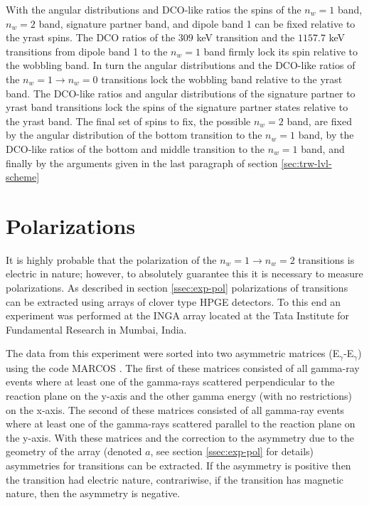With the angular distributions and DCO-like ratios the spins of the $n_w=1$ band, $n_w=2$ band, signature partner band, and dipole band 1 can be fixed relative to the yrast spins. The DCO ratios of the $309$ keV transition and the $1157.7$ keV transitions from dipole band 1 to the $n_w=1$ band firmly lock its spin relative to the wobbling band. In turn the angular distributions and the DCO-like ratios of the $n_w=1\rightarrow{}n_w=0$ transitions lock the wobbling band relative to the yrast band. The DCO-like ratios and angular distributions of the signature partner to yrast band transitions lock the spins of the signature partner states relative to the yrast band. The final set of spins to fix, the possible $n_w=2$ band, are fixed by the angular distribution of the bottom transition to the $n_w=1$ band, by the DCO-like ratios of the bottom and middle transition to the $n_w=1$ band, and finally by the arguments given in the last paragraph of section \ref{sec:trw-lvl-scheme}

\section{Polarizations}
\label{ssec:trw-lvl-pol}

It is highly probable that the polarization of the $n_w=1\rightarrow{}n_w=2$ transitions is electric in nature; however, to absolutely guarantee this it is necessary to measure polarizations. As described in section \ref{ssec:exp-pol} polarizations of transitions can be extracted using arrays of clover type HPGE detectors. To this end an experiment was performed at the INGA array \cite{ingaAtIUAC,ingaAtIuacConf} located at the Tata Institute for Fundamental Research in Mumbai, India.

The data from this experiment were sorted into two asymmetric matrices (E$_{\gamma}$-E$_{\gamma}$) using the code MARCOS \cite{IngaDigitalDAQ}. The first of these matrices consisted of all gamma-ray events where at least one of the gamma-rays scattered perpendicular to the reaction plane on the y-axis and the other gamma energy (with no restrictions) on the x-axis. The second of these matrices consisted of all gamma-ray events where at least one of the gamma-rays scattered parallel to the reaction plane on the y-axis. With these matrices and the correction to the asymmetry due to the geometry of the array (denoted $a$, see section \ref{ssec:exp-pol} for details) asymmetries for transitions can be extracted. If the asymmetry is positive then the transition had electric nature, contrariwise, if the transition has magnetic nature, then the asymmetry is negative.

